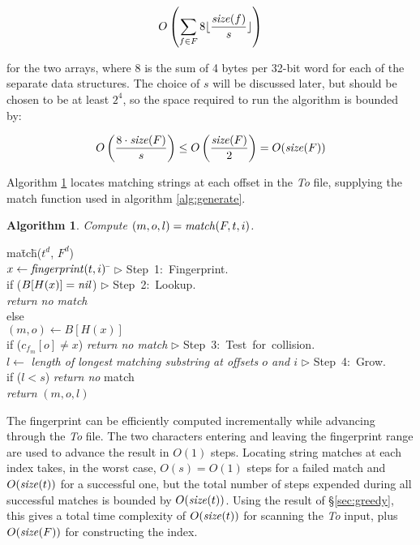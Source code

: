 \documentclass{llncs}
\newtheorem{alg}{{\sc Algorithm}}
\begin{document}
\begin{equation}
O\left(\sum_{f \in F} 8 \lfloor \frac{\textrm{\emph{size}}(f)}{s}  \rfloor\right)
\end{equation}

\noindent for the two arrays, where 8 is the sum of 4 bytes per 32-bit
word for each of the separate data structures.  The choice of $s$ will
be discussed later, but should be chosen to be at least $2^4$, so the
space required to run the algorithm is bounded by:

\begin{equation}
O\left(\frac{8 \cdot \textrm{\emph{size}}(F)}{s}\right) \le O\left(\frac{\textrm{\emph{size}}(F)}{2}\right) = O(\textrm{\emph{size}}(F)) \label{action-bound}
\end{equation}

Algorithm \ref{alg:match} locates matching strings at each offset in
the \emph{To} file, supplying the match function used in algorithm
\ref{alg:generate}.

\begin{alg}\label{alg:match}
Compute $(m,o,l) = \textrm{\emph{match}} (F,t,i)$.
\end{alg}

\begin{figure*}
\begin{program}
ma\=tc\=h($t^d$, $F^d$) \\
  \> $x \leftarrow \textrm{\emph{fingerprint}}(t,i)$ \> \hspace{9cm} \= $\triangleright$ \hbox{Step 1: Fingerprint. } \\
  \> if ($B[H(x)] = \textrm{\emph{nil}}$) \>\> $\triangleright$ \hbox{Step 2: Lookup.} \\
  \>\> \textrm{\emph{return no match}} \\
  \> else \\
  \>\> $(m,o) \leftarrow B[H(x)]$ \\
  \> if ($c_{f_m}[o] \not = x$) \textrm{\emph{return no match}} \>\> $\triangleright$ \hbox{Step 3: Test for collision.} \\
  \> $l \leftarrow$ \textrm{\emph{length of longest matching substring at offsets $o$ and $i$}} \>\> $\triangleright$ \hbox{Step 4: Grow.} \\
  \> if ($l < s$) \textrm{\emph{return no} match} \\
  \> \textrm{\emph{return}} $(m,o,l)$ \\
\end{program}
\caption{Algorithm \ref{alg:match}}\label{fig:match}
\end{figure*}

The fingerprint can be efficiently computed incrementally while
advancing through the \emph{To} file.  The two characters entering and
leaving the fingerprint range are used to advance the result in $O(1)$
steps.  Locating string matches at each index takes, in the worst
case, $O(s) = O(1)$ steps for a failed match and $O(\textrm{\emph{size}}(t))$ for a
successful one, but the total number of steps expended during all
successful matches is bounded by $O(\textrm{\emph{size}}(t))$.  Using the result of
\S\ref{sec:greedy}, this gives a total time complexity of
$O(\textrm{\emph{size}}(t))$ for scanning the \emph{To} input, plus $O(\textrm{\emph{size}}(F))$ for
constructing the index.
\end{document}
